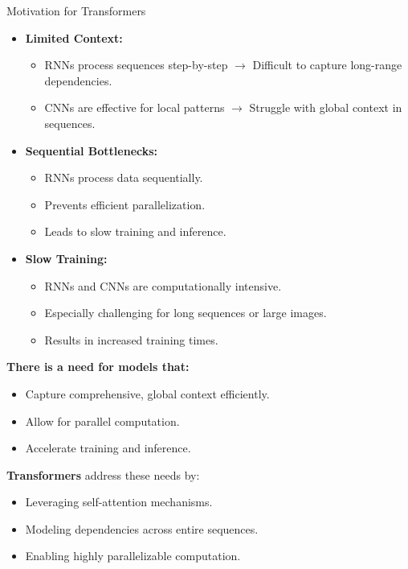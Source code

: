 \begin{frame}[allowframebreaks]{Motivation for Transformers}
    \begin{itemize}
        \item \textbf{Limited Context:}
        \begin{itemize}
            \item RNNs process sequences step-by-step $\rightarrow$ Difficult to capture long-range dependencies.
            \item CNNs are effective for local patterns $\rightarrow$ Struggle with global context in sequences.
        \end{itemize}
        \item \textbf{Sequential Bottlenecks:}
        \begin{itemize}
            \item RNNs process data sequentially.
            \item Prevents efficient parallelization.
            \item Leads to slow training and inference.
        \end{itemize}
        \item \textbf{Slow Training:}
        \begin{itemize}
            \item RNNs and CNNs are computationally intensive.
            \item Especially challenging for long sequences or large images.
            \item Results in increased training times.
        \end{itemize}
    \end{itemize}
    \framebreak
    \textbf{There is a need for models that:}
    \begin{itemize}
        \item Capture comprehensive, global context efficiently.
        \item Allow for parallel computation.
        \item Accelerate training and inference.
    \end{itemize}
    \textbf{Transformers} address these needs by:
    \begin{itemize}
        \item Leveraging self-attention mechanisms.
        \item Modeling dependencies across entire sequences.
        \item Enabling highly parallelizable computation.
    \end{itemize}
\end{frame}

